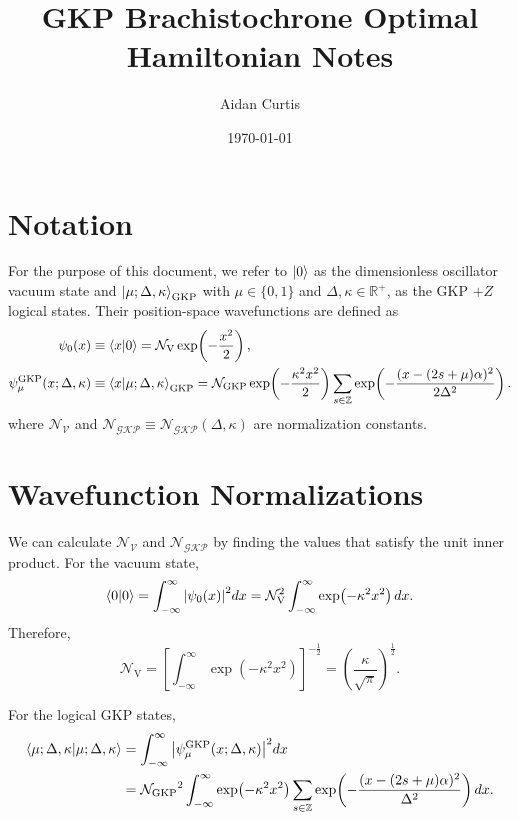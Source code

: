 \documentclass[11pt]{article}
\title{GKP Brachistochrone Optimal Hamiltonian Notes}
\author{Aidan Curtis}
\date{\today}
\begin{document}
\maketitle

\section{Notation}

For the purpose of this document, we refer to $\ket{0}$ as the dimensionless oscillator vacuum state and $\ket{\mu ; \Delta, \kappa}_{\text{GKP}}$ with $\mu \in \{0,1\}$ and $\Delta, \kappa \in \mathbb{R}^+$, as the GKP $+Z$ logical states. Their position-space wavefunctions are defined as
\begin{align}
    \psi_0(x)                                    & \equiv \braket{x}{0}
    = \mathcal{N}_{\mathrm{V}} \exp\!\left(-\frac{x^2}{2}\right),                                       \\
    \psi_{\mu}^{\mathrm{GKP}}(x; \Delta, \kappa) & \equiv \braket{x}{\mu ; \Delta, \kappa}_{\text{GKP}}
    = \mathcal{N}_{\mathrm{GKP}} \exp\!\left(-\frac{\kappa^2 x^2}{2}\right)
    \sum_{s \in \mathbb{Z}}
    \exp\!\left(-\frac{(x - (2s + \mu)\alpha)^2}{2\Delta^2}\right).
\end{align}
where $\mathcal{N_\text{V}}$ and $\mathcal{N_{\text{GKP}}} \equiv \mathcal{N_{\text{GKP}}}(\Delta, \kappa)$ are normalization constants.

\section{Wavefunction Normalizations}
We can calculate $\mathcal{N_\text{V}}$ and $\mathcal{N_{\text{GKP}}}$ by finding the values that satisfy the unit inner product. For the vacuum state,
$$
    \braket{0}{0} = \int_{-\infty}^{\infty} \abs{\psi_0(x)}^2 dx = \mathcal{N}_{\mathrm{V}}^2 \int_{-\infty}^{\infty} \exp\!\left(-\kappa^2 x^2\right) dx.
$$
Therefore,
$$
    \mathcal{N}_{\mathrm{V}} = \left[\int_{-\infty}^{\infty} \exp\!\left(-\kappa^2 x^2\right)\right]^{-\frac{1}{2}} = \left(\frac{\kappa}{\sqrt{\pi}}\right)^{\frac{1}{2}}.
$$

For the logical GKP states,
\begin{align*}
    \braket{\mu ; \Delta, \kappa}{\mu ; \Delta, \kappa} & = \int_{-\infty}^{\infty} \abs{\psi_{\mu}^{\mathrm{GKP}}(x; \Delta, \kappa)}^2 dx     \\
                                                        & = \mathcal{N_{\text{GKP}}}^2 \int_{-\infty}^{\infty} \exp\!\left(-\kappa^2 x^2\right)
    \sum_{s \in \mathbb{Z}}
    \exp\!\left(-\frac{(x - (2s + \mu)\alpha)^2}{\Delta^2}\right) dx.
\end{align*}
\end{document}
